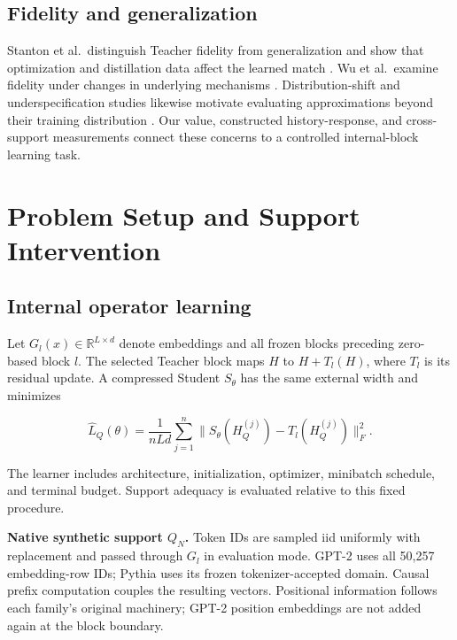 \subsection{Fidelity and generalization}\label{fidelity-and-generalization}

Stanton et al.~distinguish Teacher fidelity from generalization and show that optimization and distillation data affect the learned match \citep{stanton2021distillation}. Wu et al.~examine fidelity under changes in underlying mechanisms \citep{wu2024mechanisms}. Distribution-shift and underspecification studies likewise motivate evaluating approximations beyond their training distribution \citep{sugiyama2007covariate, ben2010domains, damour2022underspecification}. Our value, constructed history-response, and cross-support measurements connect these concerns to a controlled internal-block learning task.

\section{Problem Setup and Support Intervention}\label{problem-setup-and-support-intervention}

\subsection{Internal operator learning}\label{internal-operator-learning}

Let \(G_l(x)\in\mathbb R^{L\times d}\) denote embeddings and all frozen blocks preceding zero-based block \(l\). The selected Teacher block maps \(H\) to \(H+T_l(H)\), where \(T_l\) is its residual update. A compressed Student \(S_\theta\) has the same external width and minimizes

\[\widehat L_Q(\theta)=\frac{1}{nLd}\sum_{j=1}^{n}\|S_\theta(H_Q^{(j)})-T_l(H_Q^{(j)})\|_F^2.\]

The learner includes architecture, initialization, optimizer, minibatch schedule, and terminal budget. Support adequacy is evaluated relative to this fixed procedure.

\textbf{Native synthetic support \(Q_N\).} Token IDs are sampled iid uniformly with replacement and passed through \(G_l\) in evaluation mode. GPT-2 uses all 50,257 embedding-row IDs; Pythia uses its frozen tokenizer-accepted domain. Causal prefix computation couples the resulting vectors. Positional information follows each family's original machinery; GPT-2 position embeddings are not added again at the block boundary.


